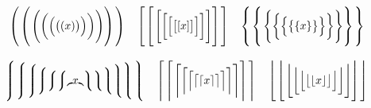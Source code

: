 \typesize=10pt





\def\biggg#1{{\hbox{$\left#1\vbox to20.5pt{}\right.$}}}
\def\bigggl{\mathopen\biggg}
\def\bigggr{\mathclose\biggg}
\def\Biggg#1{{\hbox{$\left#1\vbox to23.5pt{}\right.$}}}
\def\Bigggl{\mathopen\Biggg}
\def\Bigggr{\mathclose\Biggg}



\def\biggg#1{{\hbox{$\left#1\vbox to19.62pt{}\right.$}}}
\def\bigggl{\mathopen\biggg}
\def\bigggr{\mathclose\biggg}
\def\Biggg#1{{\hbox{$\left#1\vbox to22.37pt{}\right.$}}}
\def\Bigggl{\mathopen\Biggg}
\def\Bigggr{\mathclose\Biggg}

$$
\Bigggl(\bigggl(\Biggl(\biggl(\Bigl(\bigl(({x})\bigr)\Bigr)\biggr)\Biggr)\bigggr)\Bigggr)
\quad 
\Bigggl[\bigggl[\Biggl[\biggl[\Bigl[\bigl[[{x}]\bigr]\Bigr]\biggr]\Biggr]\bigggr]\Bigggr]
\quad  
\Bigggl\{\bigggl\{\Biggl\{\biggl\{\Bigl\{\bigl\{\{{x}\}\bigr\}\Bigr\}\biggr\}\Biggr\}\bigggr\}\Bigggr\}
$$

$$
\Bigggl\lmoustache\bigggl\lmoustache\Biggl\lmoustache\biggl\lmoustache\Bigl\lmoustache\bigl\lmoustache\lmoustache{x}\rmoustache\bigr\rmoustache\Bigr\rmoustache\biggr\rmoustache\Biggr\rmoustache\bigggr\rmoustache\Bigggr\rmoustache
\quad  
\Bigggl\lceil\bigggl\lceil\Biggl\lceil\biggl\lceil\Bigl\lceil\bigl\lceil\lceil{x}\rceil\bigr\rceil\Bigr\rceil\biggr\rceil\Biggr\rceil\bigggr\rceil\Bigggr\rceil
\quad  
\Bigggl\lfloor\bigggl\lfloor\Biggl\lfloor\biggl\lfloor\Bigl\lfloor\bigl\lfloor\lfloor{x}\rfloor\bigr\rfloor\Bigr\rfloor\biggr\rfloor\Biggr\rfloor\bigggr\rfloor\Bigggr\rfloor
$$

